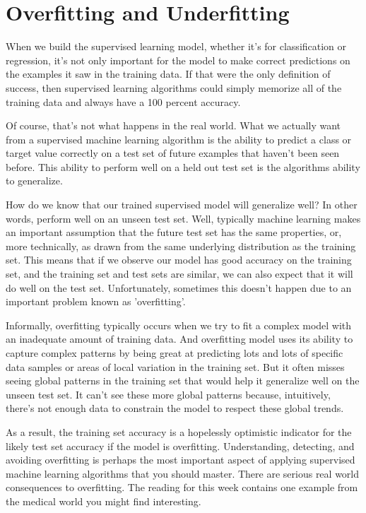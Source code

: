 \section{Overfitting and Underfitting}
\begin{multicols}{2}

When we build the supervised learning model, whether it's for classification or regression, it's not only important for the model to make correct predictions on the examples it saw in the training data. If that were the only definition of success, then supervised learning algorithms could simply memorize all of the training data and always have a 100 percent accuracy. 

Of course, that's not what happens in the real world. What we actually want from a supervised machine learning algorithm is the ability to predict a class or target value correctly on a test set of future examples that haven't been seen before. This ability to perform well on a held out test set is the algorithms ability to generalize. 

How do we know that our trained supervised model will generalize well? In other words, perform well on an unseen test set. Well, typically machine learning makes an important assumption that the future test set has the same properties, or, more technically, as drawn from the same underlying distribution as the training set. This means that if we observe our model has good accuracy on the training set, and the training set and test sets are similar, we can also expect that it will do well on the test set. Unfortunately, sometimes this doesn't happen due to an important problem known as 'overfitting'. 

Informally, overfitting typically occurs when we try to fit a complex model with an inadequate amount of training data. And overfitting model uses its ability to capture complex patterns by being great at predicting lots and lots of specific data samples or areas of local variation in the training set. But it often misses seeing global patterns in the training set that would help it generalize well on the unseen test set. It can't see these more global patterns because, intuitively, there's not enough data to constrain the model to respect these global trends. 

As a result, the training set accuracy is a hopelessly optimistic indicator for the likely test set accuracy if the model is overfitting. Understanding, detecting, and avoiding overfitting is perhaps the most important aspect of applying supervised machine learning algorithms that you should master. There are serious real world consequences to overfitting. The reading for this week contains one example from the medical world you might find interesting. 


\end{multicols}
